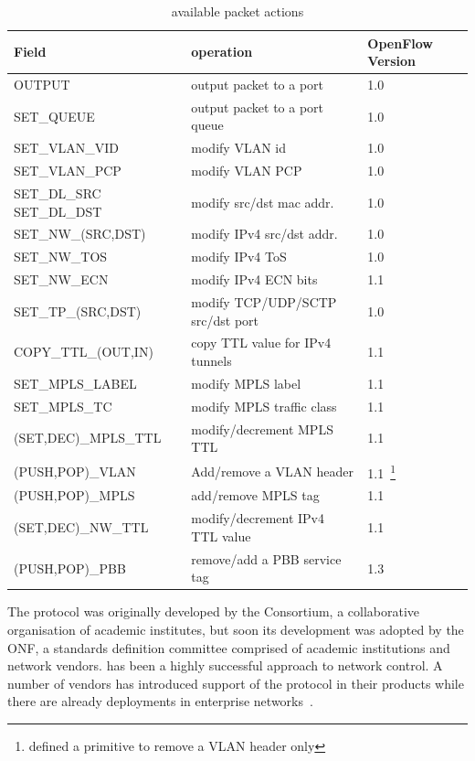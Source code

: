   \begin{table}
  \begin{minipage} [b]{0.49\textwidth} 
    \begin{tabular}{| p{4cm} | p{6cm}  | p{1.5cm} |} 
      \hline
      Field & operation & OpenFlow Version \\ \hline
      OUTPUT & output packet to a port & 1.0 \\ \hline
      SET\_QUEUE & output packet to a port queue & 1.0 \\ \hline
      SET\_VLAN\_VID & modify VLAN id & 1.0 \\ \hline 
      SET\_VLAN\_PCP & modify VLAN PCP & 1.0 \\ \hline
      SET\_DL\_SRC SET\_DL\_DST & modify src/dst mac addr. & 1.0 \\ \hline
      SET\_NW\_(SRC,DST) & modify IPv4 src/dst addr. & 1.0 \\ \hline
      SET\_NW\_TOS & modify IPv4 ToS & 1.0 \\ \hline
      SET\_NW\_ECN & modify IPv4 ECN bits & 1.1 \\ \hline
      SET\_TP\_(SRC,DST) & modify TCP/UDP/SCTP src/dst port & 1.0 \\ \hline
      COPY\_TTL\_(OUT,IN) & copy TTL value for IPv4 tunnels & 1.1  \\ \hline
      SET\_MPLS\_LABEL & modify MPLS label & 1.1 \\ \hline
      SET\_MPLS\_TC & modify MPLS traffic class & 1.1 \\ \hline
      (SET,DEC)\_MPLS\_TTL & modify/decrement MPLS TTL & 1.1 \\ \hline
      (PUSH,POP)\_VLAN & Add/remove a VLAN header & 1.1~\footnote{\of 1.0 defined
        a primitive to remove a VLAN header only} \\ \hline
      (PUSH,POP)\_MPLS & add/remove MPLS tag & 1.1 \\ \hline
      (SET,DEC)\_NW\_TTL & modify/decrement IPv4 TTL value & 1.1 \\ \hline
      (PUSH,POP)\_PBB & remove/add a PBB service tag & 1.3 \\ \hline

    \end{tabular}
  \end{minipage}
  \caption{\of available packet actions} \label{tbl:background:openflow_actions}
\end{table}

The \of protocol was originally developed by the \of Consortium, a collaborative
organisation of academic institutes, but soon its development was adopted by the
ONF, a standards definition committee comprised of academic institutions and
network vendors. \of has been a highly successful approach to network control. A
number of vendors has introduced support of the protocol in their products while
there are already \of deployments in enterprise
networks~\cite{google_of,Kobayashi:vn}.


